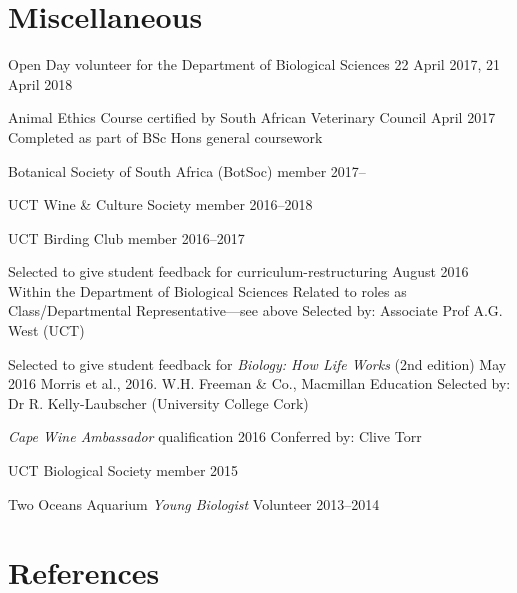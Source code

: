\documentclass[10pt]{article}
\begin{document}
\section*{Miscellaneous} %

\begin{hangparas}{2em}{1}

Open Day volunteer for the Department of Biological Sciences
                                    \hfill {\small 22 April 2017, 21 April 2018}

Animal Ethics Course certified by South African Veterinary Council
                                                        \hfill April 2017 \break
Completed as part of BSc Hons general coursework

Botanical Society of South Africa (BotSoc) member         \hfill {\small 2017--}

UCT Wine \& Culture Society member                    \hfill {\small 2016--2018}

UCT Birding Club member                               \hfill {\small 2016--2017}

Selected to give student feedback for curriculum-restructuring
                                              \hfill {\small August 2016} \break
Within the Department of Biological Sciences \break
Related to roles as Class/Departmental Representative---see above \break
Selected by: Associate Prof A.G. West (UCT)

Selected to give student feedback for \textit{Biology: How Life Works} (2nd 
edition)                                         \hfill {\small May 2016} \break
Morris et al., 2016. W.H. Freeman \& Co., Macmillan Education \break
Selected by: Dr R. Kelly-Laubscher (University College Cork)

\textit{Cape Wine Ambassador} qualification          \hfill {\small 2016} \break
Conferred by: Clive Torr

UCT Biological Society member                               \hfill {\small 2015}

Two Oceans Aquarium \textit{Young Biologist} Volunteer \hfill {\small 2013--2014}

\hfill

\end{hangparas}

\hrulefill

\section*{References} %
\end{document}
